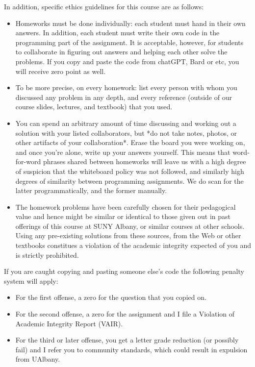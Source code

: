 \documentclass[a4paper,10pt]{article}
\begin{document}
In addition, specific ethics guidelines for this course are as follows: 
\begin{itemize}
\item Homeworks must be done individually: each student must hand in their own answers. In addition, each student must write their own code in the programming part of the assignment. It is acceptable, however, for students to collaborate in figuring out answers and helping each other solve the problems. If you copy and paste the code from chatGPT, Bard or etc, you will receive zero point as well. 

\item To be more precise, on every homework:
list every person with whom you discussed any problem in any depth, and every reference (outside of our course slides, lectures, and textbook) that you used.

\item You can spend an arbitrary amount of time discussing and working out a solution with your listed collaborators, but *do not take notes, photos, or other artifacts of your collaboration*. Erase the board you were working on, and once you're alone, write up your answers yourself.
This means that word-for-word phrases shared between homeworks will leave us with a high degree of suspicion that the whiteboard policy was not followed, and similarly high degrees of similarity between programming assignments. We do scan for the latter programmatically, and the former manually.

\item The homework problems have been carefully chosen for their pedagogical value and hence might be similar or identical to those given out in past offerings of this course at SUNY Albany, or similar courses at other schools. Using any pre-existing solutions from these sources, from the Web or other textbooks constitues a violation of the academic integrity expected of you and is strictly prohibited.
\end{itemize}

If you are caught copying and pasting someone else’s code the following penalty system will apply:
\begin{itemize}
\item For the first offense, a zero for the question that you copied on.
\item For the second offense, a zero for the assignment and I file a Violation of Academic Integrity Report (VAIR).
\item For the third or later offense, you get a letter grade reduction (or possibly fail) and I refer you to community standards, which could result in expulsion from UAlbany.
\end{itemize}
\end{document}
